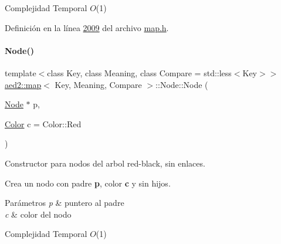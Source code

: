 \begin{DoxyDescription}
\item[Complejidad Temporal]$O$(1)
\end{DoxyDescription}

Definición en la línea \hyperlink{map_8h_source_l02009}{2009} del archivo \hyperlink{map_8h_source}{map.\+h}.

\mbox{\label{structaed2_1_1map_1_1Node_a62b5a42e88e219d53af8237a9ebedb6e_a62b5a42e88e219d53af8237a9ebedb6e}} 
\paragraph{\texorpdfstring{Node()}{Node()}\hspace{0.1cm}{\footnotesize\ttfamily [2/2]}}
{\footnotesize\ttfamily template$<$class Key, class Meaning, class Compare = std\+::less$<$\+Key$>$$>$ \\
\hyperlink{classaed2_1_1map}{aed2\+::map}$<$ Key, Meaning, Compare $>$\+::Node\+::\+Node (\begin{DoxyParamCaption}\item[{\hyperlink{structaed2_1_1map_1_1Node}{Node} $\ast$}]{p,  }\item[{\hyperlink{classaed2_1_1map_a6d62a415a4b9d320b30cada4ebcf9f5b_a6d62a415a4b9d320b30cada4ebcf9f5b}{Color}}]{c = {\ttfamily Color\+:\+:Red} }\end{DoxyParamCaption})\hspace{0.3cm}{\ttfamily [inline]}}



Constructor para nodos del arbol red-\/black, sin enlaces. 

Crea un nodo con padre {\bfseries p}, color {\bfseries c} y sin hijos.


\begin{DoxyParams}{Parámetros}
{\em p} & puntero al padre \\
\hline
{\em c} & color del nodo\\
\hline
\end{DoxyParams}

\begin{DoxyDescription}
\item[Complejidad Temporal]$O$(1)
\end{DoxyDescription}

